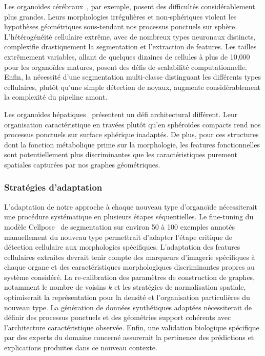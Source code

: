 Les organoïdes cérébraux~\cite{Lancaster2013}, par exemple, posent des difficultés considérablement plus grandes. Leurs morphologies irrégulières et non-sphériques violent les hypothèses géométriques sous-tendant nos processus ponctuels sur sphère. L'hétérogénéité cellulaire extrême, avec de nombreux types neuronaux distincts, complexifie drastiquement la segmentation et l'extraction de features. Les tailles extrêmement variables, allant de quelques dizaines de cellules à plus de 10,000 pour les organoïdes matures, posent des défis de scalabilité computationnelle. Enfin, la nécessité d'une segmentation multi-classe distinguant les différents types cellulaires, plutôt qu'une simple détection de noyaux, augmente considérablement la complexité du pipeline amont.

Les organoïdes hépatiques~\cite{Huch2015} présentent un défi architectural différent. Leur organisation caractéristique en travées plutôt qu'en sphéroïdes compacts rend nos processus ponctuels sur surface sphérique inadaptés. De plus, pour ces structures dont la fonction métabolique prime sur la morphologie, les features fonctionnelles sont potentiellement plus discriminantes que les caractéristiques purement spatiales capturées par nos graphes géométriques.

\subsubsection{Stratégies d'adaptation}

L'adaptation de notre approche à chaque nouveau type d'organoïde nécessiterait une procédure systématique en plusieurs étapes séquentielles. Le fine-tuning du modèle Cellpose~\cite{Stringer2021} de segmentation sur environ 50 à 100 exemples annotés manuellement du nouveau type permettrait d'adapter l'étape critique de détection cellulaire aux morphologies spécifiques. L'adaptation des features cellulaires extraites devrait tenir compte des marqueurs d'imagerie spécifiques à chaque organe et des caractéristiques morphologiques discriminantes propres au système considéré. La re-calibration des paramètres de construction de graphes, notamment le nombre de voisins $k$ et les stratégies de normalisation spatiale, optimiserait la représentation pour la densité et l'organisation particulières du nouveau type. La génération de données synthétiques adaptées nécessiterait de définir des processus ponctuels et des géométries support cohérents avec l'architecture caractéristique observée. Enfin, une validation biologique spécifique par des experts du domaine concerné assurerait la pertinence des prédictions et explications produites dans ce nouveau contexte.


